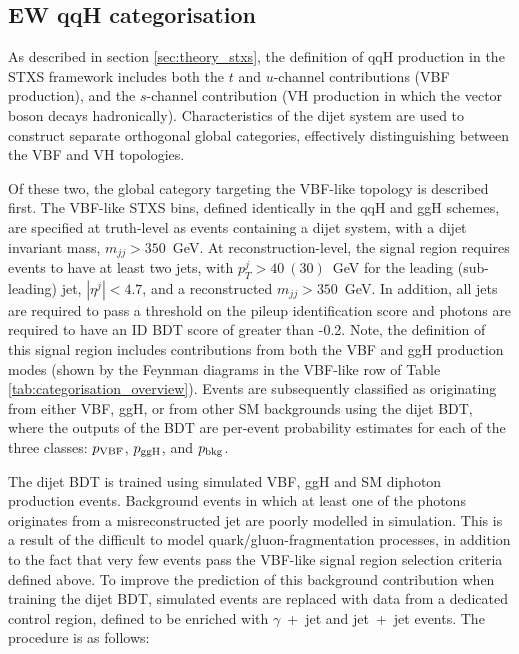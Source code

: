 \FloatBarrier

\subsection{EW qqH categorisation}\label{sec:qqH_categorisation}
As described in section \ref{sec:theory_stxs}, the definition of qqH production in the STXS framework includes both the $t$ and $u$-channel contributions (VBF production), and the $s$-channel contribution (VH production in which the vector boson decays hadronically). Characteristics of the dijet system are used to construct separate orthogonal global categories, effectively distinguishing between the VBF and VH topologies.

Of these two, the global category targeting the VBF-like topology is described first. The VBF-like STXS bins, defined identically in the qqH and ggH schemes, are specified at truth-level as events containing a dijet system, with a dijet invariant mass, $m_{jj}>350$~GeV. At reconstruction-level, the signal region requires events to have at least two jets, with $p_T^{j}>40~(30)$~GeV for the leading (sub-leading) jet, $|\eta^j|<4.7$, and a reconstructed $m_{jj}>350$~GeV. In addition, all jets are required to pass a threshold on the pileup identification score and photons are required to have an ID BDT score of greater than -0.2. Note, the definition of this signal region includes contributions from both the VBF and ggH production modes (shown by the Feynman diagrams in the VBF-like row of Table \ref{tab:categorisation_overview}). Events are subsequently classified as originating from either VBF, ggH, or from other SM backgrounds using the dijet BDT, where the outputs of the BDT are per-event probability estimates for each of the three classes: $p_{\rm{VBF}}$, $p_{\rm{ggH}}$, and $p_{\rm{bkg}}$.

The dijet BDT is trained using simulated VBF, ggH and SM diphoton production events. Background events in which at least one of the photons originates from a misreconstructed jet are poorly modelled in simulation. This is a result of the difficult to model quark/gluon-fragmentation processes, in addition to the fact that very few events pass the VBF-like signal region selection criteria defined above. To improve the prediction of this background contribution when training the dijet BDT, simulated events are replaced with data from a dedicated control region, defined to be enriched with $\gamma$~+~jet and jet~+~jet events. The procedure is as follows:


